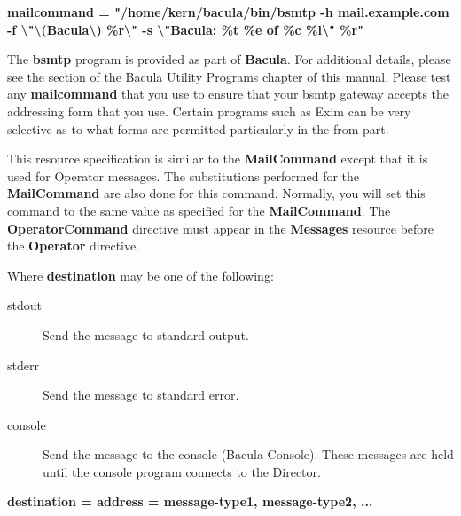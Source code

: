\begin{description}
{\bf mailcommand = "/home/kern/bacula/bin/bsmtp -h mail.example.com -f
\textbackslash{}"\textbackslash{}(Bacula\textbackslash{})
\%r\textbackslash{}" -s \textbackslash{}"Bacula: \%t \%e of \%c
\%l\textbackslash{}" \%r"}

The {\bf bsmtp} program is provided as part of {\bf Bacula}.  For
additional details, please see the 
 section of
the  Bacula Utility Programs chapter of this manual. Please test any  {\bf
mailcommand} that you use to ensure that your bsmtp gateway accepts  the
addressing form that you use. Certain programs such as Exim can be very 
selective as to what forms are permitted particularly in the from part.  

\item [OperatorCommand = \lt{}command\gt{}]
   This resource specification is  similar to the {\bf MailCommand} except that
   it is used for Operator  messages. The substitutions performed for the {\bf
   MailCommand} are  also done for this command. Normally, you will set this
   command to the  same value as specified for the {\bf MailCommand}. 
   The {\bf OperatorCommand} directive must appear in the {\bf Messages}
   resource before the {\bf Operator} directive.

\item [\lt{}destination\gt{} = \lt{}message-type1\gt{},
   \lt{}message-type2\gt{}, ...]

Where {\bf destination} may be one of the following:  

\begin{description}

\item [stdout]
   Send the message to standard output.  

\item [stderr]
   Send the message to standard error.  

\item [console]
   Send the message to the console (Bacula Console).  These messages are held
until the console program  connects to the Director.  
\end{description}

\item {\bf \lt{}destination\gt{} = \lt{}address\gt{} =
   \lt{}message-type1\gt{}, \lt{}message-type2\gt{}, ...}


\end{description}
